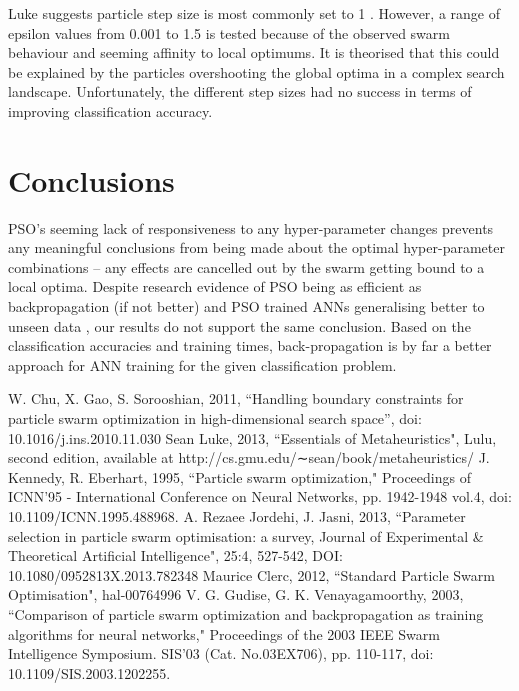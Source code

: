 \documentclass[12pt]{article}
\begin{document}
Luke suggests particle step size is most commonly set to 1 \cite{Luke}. However, a range of epsilon values from 0.001 to 1.5 is tested because of the observed swarm behaviour and seeming affinity to local optimums. It is theorised that this could be explained by the particles overshooting the global optima in a complex search landscape. Unfortunately, the different step sizes had no success in terms of improving classification accuracy.

\vspace{-1.5em}
\section{Conclusions}
\vspace{-1.5em}

PSO's seeming lack of responsiveness to any hyper-parameter changes prevents any meaningful conclusions from being made about the optimal hyper-parameter combinations -- any effects are cancelled out by the swarm getting bound to a local optima. Despite research evidence of PSO being as efficient as backpropagation (if not better) and PSO trained ANNs generalising better to unseen data \cite{Kennedy}, our results do not support the same conclusion. Based on the classification accuracies and training times, back-propagation is by far a better approach for ANN training for the given classification problem.

\vspace{-1.5em}
\begin{thebibliography}{10}

 W. Chu, X. Gao, S. Sorooshian, 2011, ``Handling boundary constraints for particle swarm optimization in high-dimensional search space'', doi: 10.1016/j.ins.2010.11.030
 Sean Luke, 2013, ``Essentials of Metaheuristics", Lulu, second edition, available at http://cs.gmu.edu/∼sean/book/metaheuristics/
 J. Kennedy, R. Eberhart, 1995, ``Particle swarm optimization," Proceedings of ICNN'95 - International Conference on Neural Networks,  pp. 1942-1948 vol.4, doi: 10.1109/ICNN.1995.488968.
 A. Rezaee Jordehi, J. Jasni, 2013, ``Parameter selection in particle swarm optimisation: a survey, Journal of Experimental \& Theoretical Artificial Intelligence", 25:4, 527-542, DOI: 10.1080/0952813X.2013.782348
 Maurice Clerc, 2012, ``Standard Particle Swarm Optimisation", hal-00764996
  V. G. Gudise, G. K. Venayagamoorthy, 2003, ``Comparison of particle swarm optimization and backpropagation as training algorithms for neural networks," Proceedings of the 2003 IEEE Swarm Intelligence Symposium. SIS'03 (Cat. No.03EX706), pp. 110-117, doi: 10.1109/SIS.2003.1202255.


\end{thebibliography}
\end{document}
